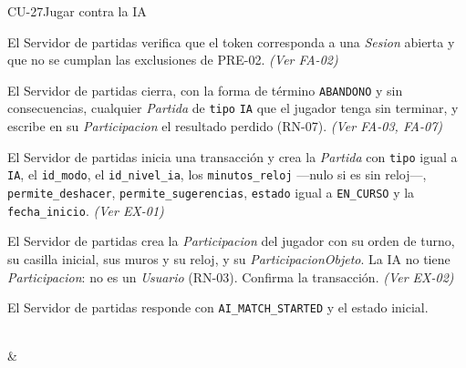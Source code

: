 \begin{fichacu}{CU-27}{Jugar contra la IA}
{\begin{cuenum}[start=1]
      \item El Servidor de partidas verifica que el token corresponda a una \textit{Sesion} abierta y que no se cumplan las exclusiones de \mbox{PRE-02}. \textit{(Ver \mbox{FA-02})}
      \item El Servidor de partidas cierra, con la forma de término \texttt{ABANDONO} y sin consecuencias, cualquier \textit{Partida} de \texttt{tipo} \texttt{IA} que el jugador tenga sin terminar, y escribe en su \textit{Participacion} el resultado perdido (\mbox{RN-07}). \textit{(Ver \mbox{FA-03}, \mbox{FA-07})}
      \item El Servidor de partidas inicia una transacción y crea la \textit{Partida} con \texttt{tipo} igual a \texttt{IA}, el \texttt{id\_\allowbreak{}modo}, el \texttt{id\_\allowbreak{}nivel\_\allowbreak{}ia}, los \texttt{minutos\_\allowbreak{}reloj} —nulo si es sin reloj—, \texttt{permite\_\allowbreak{}deshacer}, \texttt{permite\_\allowbreak{}sugerencias}, \texttt{estado} igual a \texttt{EN\_\allowbreak{}CURSO} y la \texttt{fecha\_\allowbreak{}inicio}. \textit{(Ver \mbox{EX-01})}
      \item El Servidor de partidas crea la \textit{Participacion} del jugador con su orden de turno, su casilla inicial, sus muros y su reloj, y su \textit{ParticipacionObjeto}. La IA no tiene \textit{Participacion}: no es un \textit{Usuario} (\mbox{RN-03}). Confirma la transacción. \textit{(Ver \mbox{EX-02})}
      \item El Servidor de partidas responde con \texttt{AI\_\allowbreak{}MATCH\_\allowbreak{}STARTED} y el estado inicial.
    \end{cuenum}} \\
   & 
\end{fichacu}
